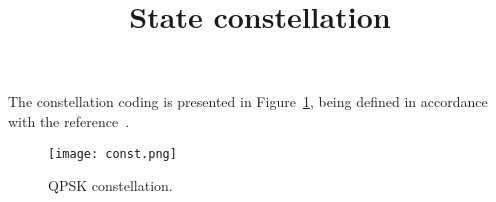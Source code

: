 \documentclass{article}
\begin{document}
\title{State constellation}
\maketitle

The constellation coding is presented in Figure~\ref{fig:constelacao}, being defined in accordance with the reference~\cite{qingxu}.

\begin{figure}[h]
	\centering
	\texttt{[image: const.png]}
	\caption{QPSK constellation.}
	\label{fig:constelacao}
\end{figure}



\end{document}
